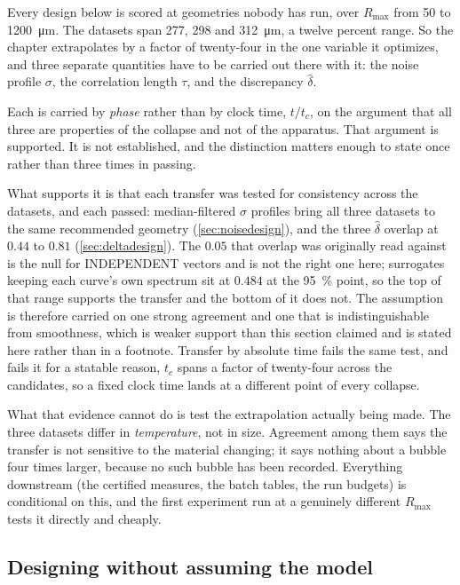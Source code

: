 \documentclass[10pt]{article}
\begin{document}
Every design below is scored at geometries nobody has run, over $R_{\max}$ from \SI{50}{} to
\SI{1200}{\micro\metre}. The datasets span \SI{277}{}, \SI{298}{} and \SI{312}{\micro\metre}, a
twelve percent range. So the chapter extrapolates by a factor of twenty-four in the one variable
it optimizes, and three separate quantities have to be carried out there with it: the noise
profile $\sigma$, the correlation length $\tau$, and the discrepancy $\hat\delta$.

Each is carried by \emph{phase} rather than by clock time, $t/t_c$, on the argument that all
three are properties of the collapse and not of the apparatus. That argument is supported. It is
not established, and the distinction matters enough to state once rather than three times in
passing.

What supports it is that each transfer was tested for consistency across the datasets, and each
passed: median-filtered $\sigma$ profiles bring all three datasets to the same recommended
geometry (\cref{sec:noisedesign}), and the three $\hat\delta$ overlap at $0.44$ to $0.81$
(\cref{sec:deltadesign}). The $0.05$ that overlap was originally read against is the null for
INDEPENDENT vectors and is not the right one here; surrogates keeping each curve's own spectrum
sit at $0.484$ at the \SI{95}{\percent} point, so the top of that range supports the transfer and
the bottom of it does not. The assumption is therefore carried on one strong agreement and one
that is indistinguishable from smoothness, which is weaker support than this section claimed and
is stated here rather than in a footnote. Transfer by absolute time fails the same
test, and fails it for a statable reason, $t_c$ spans a factor of twenty-four across the
candidates, so a fixed clock time lands at a different point of every collapse.

What that evidence cannot do is test the extrapolation actually being made. The three datasets
differ in \emph{temperature}, not in size. Agreement among them says the transfer is not
sensitive to the material changing; it says nothing about a bubble four times larger, because no
such bubble has been recorded. Everything downstream (the certified measures, the batch
tables, the run budgets) is conditional on this, and the first experiment run at a genuinely
different $R_{\max}$ tests it directly and cheaply.

\subsection*{Designing without assuming the model}
\end{document}

